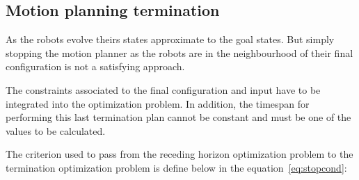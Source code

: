 \documentclass[eprint]{actapoly}
\begin{document}
%
%
%
%
%

\subsection{Motion planning termination}


As the robots evolve theirs states approximate to the goal states.
But simply stopping the motion planner as the robots are in the neighbourhood of
their final configuration is not a satisfying approach.

The constraints associated to the final configuration and input have to be integrated 
into the optimization problem. In addition, the timespan for performing this last
termination plan cannot be constant and must be one of the values to be calculated.

The criterion used to pass from the receding horizon optimization problem to the termination optimization problem
is define below in the equation~\ref{eq:stopcond}:
\end{document}
